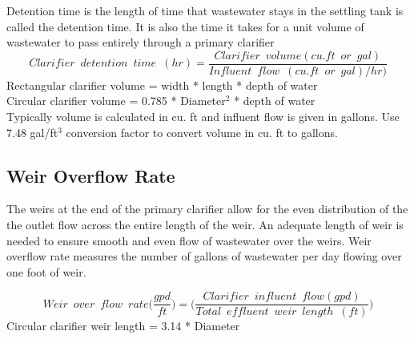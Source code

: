 Detention time is the length of time that wastewater stays in the settling tank is called the detention time.  It is also the time it takes for a unit volume of wastewater to pass entirely through a primary clarifier\\
$$Clarifier \enspace detention \enspace time \enspace (hr) = 	\dfrac{ Clarifier \enspace volume (cu.ft \enspace or \enspace gal)}{Influent \enspace flow \enspace (cu.ft \enspace or \enspace gal)/hr)}$$
Rectangular clarifier volume = width * length * depth of water\\
Circular clarifier volume = 0.785 * Diameter$^2$ * depth of water\\
Typically volume is calculated in cu. ft and influent flow is given in gallons.  Use 7.48 gal/ft$^3$ conversion factor to convert volume in cu. ft to gallons.\\

\subsection{Weir Overflow Rate}
The weirs at the end of the primary clarifier allow for the even distribution of the the outlet flow across the entire length of the weir.  An adequate length of weir is needed to ensure smooth and even flow of wastewater over the weirs.  Weir overflow rate measures the number of gallons of wastewater per day flowing over one foot of weir. 

		$$Weir \enspace over \enspace flow \enspace rate \Big(\dfrac{gpd}{ft}\Big) =\Big(\dfrac{Clarifier \enspace influent \enspace  flow (gpd)}{Total \enspace effluent 					\enspace weir \enspace length \enspace (ft)}\Big)$$
		Circular clarifier weir length = 3.14 * Diameter\\

